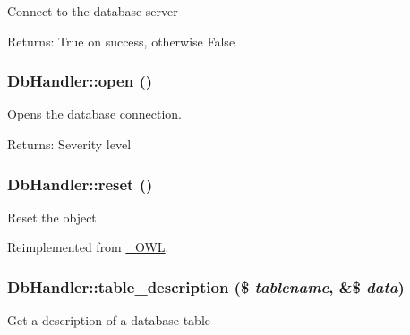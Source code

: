 Connect to the database server

\begin{Desc}
\item[Returns:]True on success, otherwise False \end{Desc}
\hypertarget{classDbHandler_fccbfc69ead84f8445116e050d1cfc2d}{
\subsubsection{\setlength{\rightskip}{0pt plus 5cm}DbHandler::open ()}}
\label{classDbHandler_fccbfc69ead84f8445116e050d1cfc2d}


Opens the database connection.

\begin{Desc}
\item[Returns:]Severity level \end{Desc}
\hypertarget{classDbHandler_9982df4830f05803935bb31bac7fae3d}{
\subsubsection{\setlength{\rightskip}{0pt plus 5cm}DbHandler::reset ()}}
\label{classDbHandler_9982df4830f05803935bb31bac7fae3d}


Reset the object 

Reimplemented from \hyperlink{class__OWL_2f2a042bcf31965194c03033df0edc9b}{\_\-OWL}.\hypertarget{classDbHandler_00402b0e3e677108716714fbf94bea40}{
\subsubsection{\setlength{\rightskip}{0pt plus 5cm}DbHandler::table\_\-description (\$ {\em tablename}, \&\$ {\em data})}}
\label{classDbHandler_00402b0e3e677108716714fbf94bea40}


Get a description of a database table

